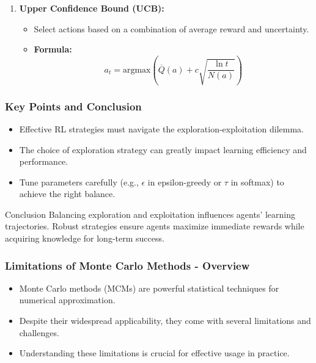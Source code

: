 \documentclass[aspectratio=169]{beamer}
\begin{document}
\begin{frame}[fragile]
\begin{enumerate}
        \item \textbf{Upper Confidence Bound (UCB):}
            \begin{itemize}
                \item Select actions based on a combination of average reward and uncertainty.
                \item \textbf{Formula:}
                \begin{equation}
                    a_t = \text{argmax} \left( \overline{Q}(a) + c \sqrt{\frac{\ln t}{N(a)}} \right)
                \end{equation}
            \end{itemize}
    \end{enumerate}
\end{frame}

\begin{frame}[fragile]
    \frametitle{Key Points and Conclusion}
    \begin{itemize}
        \item Effective RL strategies must navigate the exploration-exploitation dilemma.
        \item The choice of exploration strategy can greatly impact learning efficiency and performance.
        \item Tune parameters carefully (e.g., $\epsilon$ in epsilon-greedy or $\tau$ in softmax) to achieve the right balance.
    \end{itemize}
    \begin{block}{Conclusion}
        Balancing exploration and exploitation influences agents' learning trajectories. Robust strategies ensure agents maximize immediate rewards while acquiring knowledge for long-term success.
    \end{block}  
\end{frame}

\begin{frame}[fragile]
    \frametitle{Limitations of Monte Carlo Methods - Overview}
    \begin{itemize}
        \item Monte Carlo methods (MCMs) are powerful statistical techniques for numerical approximation.
        \item Despite their widespread applicability, they come with several limitations and challenges.
        \item Understanding these limitations is crucial for effective usage in practice.
    \end{itemize}
\end{frame}
\end{document}

